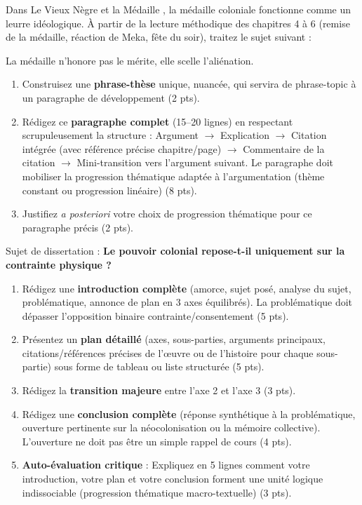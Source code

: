 \documentclass[11pt]{article}
\begin{document}
\begin{exercice}
Dans \og Le Vieux Nègre et la Médaille \fg{}, la médaille coloniale fonctionne comme un leurre idéologique. À partir de la lecture méthodique des chapitres 4 à 6 (remise de la médaille, réaction de Meka, fête du soir), traitez le sujet suivant :

\og La médaille n'honore pas le mérite, elle scelle l'aliénation. \fg{}

\begin{enumerate}
    \item Construisez une \textbf{phrase-thèse} unique, nuancée, qui servira de phrase-topic à un paragraphe de développement (2 pts).
    \item Rédigez ce \textbf{paragraphe complet} (15--20 lignes) en respectant scrupuleusement la structure : Argument $\rightarrow$ Explication $\rightarrow$ Citation intégrée (avec référence précise chapitre/page) $\rightarrow$ Commentaire de la citation $\rightarrow$ Mini-transition vers l'argument suivant. Le paragraphe doit mobiliser la progression thématique adaptée à l'argumentation (thème constant ou progression linéaire) (8 pts).
    \item Justifiez \textit{a posteriori} votre choix de progression thématique pour ce paragraphe précis (2 pts).
\end{enumerate}
\end{exercice}

\begin{exercice}
Sujet de dissertation : \og \textbf{Le pouvoir colonial repose-t-il uniquement sur la contrainte physique ?} \fg{}

\begin{enumerate}
    \item Rédigez une \textbf{introduction complète} (amorce, sujet posé, analyse du sujet, problématique, annonce de plan en 3 axes équilibrés). La problématique doit dépasser l'opposition binaire contrainte/consentement (5 pts).
    \item Présentez un \textbf{plan détaillé} (axes, sous-parties, arguments principaux, citations/références précises de l'œuvre ou de l'histoire pour chaque sous-partie) sous forme de tableau ou liste structurée (5 pts).
    \item Rédigez la \textbf{transition majeure} entre l'axe 2 et l'axe 3 (3 pts).
    \item Rédigez une \textbf{conclusion complète} (réponse synthétique à la problématique, ouverture pertinente sur la néocolonisation ou la mémoire collective). L'ouverture ne doit pas être un simple rappel de cours (4 pts).
    \item \textbf{Auto-évaluation critique} : Expliquez en 5 lignes comment votre introduction, votre plan et votre conclusion forment une unité logique indissociable (progression thématique macro-textuelle) (3 pts).
\end{enumerate}
\end{exercice}
\end{document}
